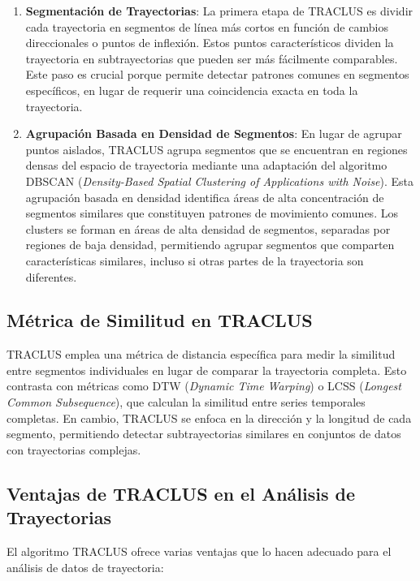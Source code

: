 \begin{enumerate}
    \item \textbf{Segmentación de Trayectorias}: La primera etapa de TRACLUS es dividir cada trayectoria en segmentos de línea más cortos en función de cambios direccionales o puntos de inflexión. Estos puntos característicos dividen la trayectoria en subtrayectorias que pueden ser más fácilmente comparables. Este paso es crucial porque permite detectar patrones comunes en segmentos específicos, en lugar de requerir una coincidencia exacta en toda la trayectoria.

    \item \textbf{Agrupación Basada en Densidad de Segmentos}: En lugar de agrupar puntos aislados, TRACLUS agrupa segmentos que se encuentran en regiones densas del espacio de trayectoria mediante una adaptación del algoritmo DBSCAN (\textit{Density-Based Spatial Clustering of Applications with Noise}). Esta agrupación basada en densidad identifica áreas de alta concentración de segmentos similares que constituyen patrones de movimiento comunes. Los clusters se forman en áreas de alta densidad de segmentos, separadas por regiones de baja densidad, permitiendo agrupar segmentos que comparten características similares, incluso si otras partes de la trayectoria son diferentes.
\end{enumerate}

\subsection*{Métrica de Similitud en TRACLUS}
TRACLUS emplea una métrica de distancia específica para medir la similitud entre segmentos individuales en lugar de comparar la trayectoria completa. Esto contrasta con métricas como DTW (\textit{Dynamic Time Warping}) o LCSS (\textit{Longest Common Subsequence}), que calculan la similitud entre series temporales completas. En cambio, TRACLUS se enfoca en la dirección y la longitud de cada segmento, permitiendo detectar subtrayectorias similares en conjuntos de datos con trayectorias complejas.

\subsection*{Ventajas de TRACLUS en el Análisis de Trayectorias}
El algoritmo TRACLUS ofrece varias ventajas que lo hacen adecuado para el análisis de datos de trayectoria:

